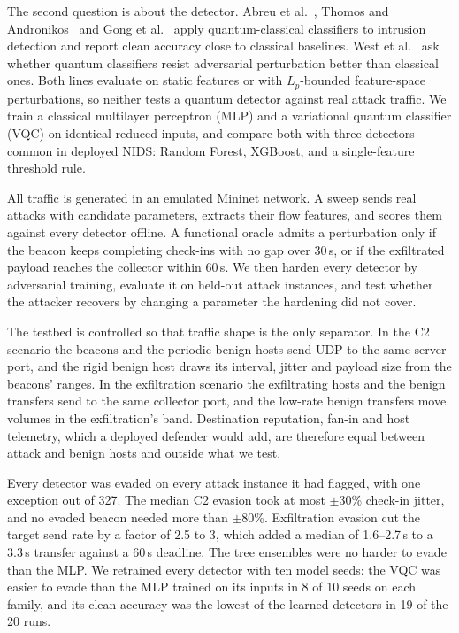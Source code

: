 \documentclass[preprint,12pt]{elsarticle}
\begin{document}
The second question is about the detector. Abreu et al.~\cite{abreu2024}, Thomos and
Andronikos~\cite{thomos2026} and Gong et al.~\cite{qvcnn2024} apply quantum-classical classifiers to
intrusion detection and report clean accuracy close to classical baselines. West et
al.~\cite{west2023nature,west2023bench} ask whether quantum classifiers resist adversarial perturbation
better than classical ones. Both lines evaluate on static features or with $L_p$-bounded
feature-space perturbations, so neither tests a quantum detector against real attack traffic. We train
a classical multilayer perceptron (MLP) and a variational quantum classifier (VQC) on identical reduced
inputs, and compare both with three detectors common in deployed NIDS: Random Forest, XGBoost, and a
single-feature threshold rule.

All traffic is generated in an emulated Mininet network. A sweep sends real attacks with candidate
parameters, extracts their flow features, and scores them against every detector offline. A functional
oracle admits a perturbation only if the beacon keeps completing check-ins with no gap over 30\,s, or if
the exfiltrated payload reaches the collector within 60\,s. We then harden every detector by
adversarial training, evaluate it on held-out attack instances, and test whether the attacker recovers
by changing a parameter the hardening did not cover.

The testbed is controlled so that traffic shape is the only separator. In the C2 scenario the beacons
and the periodic benign hosts send UDP to the same server port, and the rigid benign host draws its
interval, jitter and payload size from the beacons' ranges. In the exfiltration scenario the
exfiltrating hosts and the benign transfers send to the same collector port, and the low-rate benign
transfers move volumes in the exfiltration's band. Destination reputation, fan-in and host
telemetry, which a deployed defender would add, are therefore equal between attack and benign hosts
and outside what we test.

Every detector was evaded on every attack instance it had flagged, with one exception out of 327. The
median C2 evasion took at most $\pm$30\% check-in jitter, and no evaded beacon needed more than
$\pm$80\%. Exfiltration evasion cut the target send rate by a factor of 2.5 to 3, which added a median of
1.6--2.7\,s to a 3.3\,s transfer against a 60\,s deadline. The tree ensembles were no harder to evade
than the MLP. We retrained every detector with ten model seeds: the VQC was easier to evade than the MLP
trained on its inputs in 8 of 10 seeds on each family, and its clean accuracy was the lowest of the
learned detectors in 19 of the 20 runs.
\end{document}
